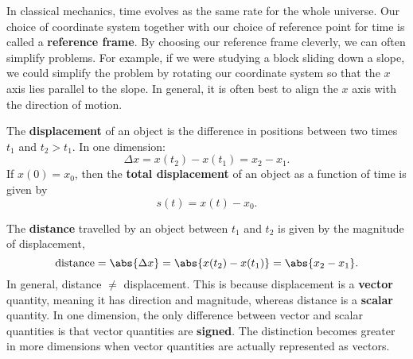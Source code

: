 \documentclass[../classical_mechanics.tex]{subfiles}
\begin{document}
        In classical mechanics, time evolves as the same rate for the whole universe.
        Our choice of coordinate system together with our choice of reference point for time is called a \textbf{reference frame}.
        By choosing our reference frame cleverly, we can often simplify problems.
        For example, if we were studying a block sliding down a slope, we could simplify the problem by rotating our coordinate system so that the $x$ axis lies parallel to the slope.
        In general, it is often best to align the $x$ axis with the direction of motion.
        \begin{definition}
            The \textbf{displacement} of an object is the difference in positions between two times $t_1$ and $t_2>t_1$. In one dimension:
            \begin{equation}
                \Delta x=x(t_2)-x(t_1)=x_2-x_1.
            \end{equation}
            If $x(0)=x_0$, then the \textbf{total displacement} of an object as a function of time is given by
            \begin{equation}
                s(t)=x(t)-x_0.
            \end{equation}
        \end{definition}
        The \textbf{distance} travelled by an object between $t_1$ and $t_2$ is given by the magnitude of displacement,
        \begin{equation}
            \mathrm{distance}=\abs{\Delta x}=\abs{x(t_2)-x(t_1)}=\abs{x_2-x_1}.
        \end{equation}
        In general, distance $\neq$ displacement.
        This is because displacement is a \textbf{vector} quantity, meaning it has direction and magnitude, whereas distance is a \textbf{scalar} quantity.
        In one dimension, the only difference between vector and scalar quantities is that vector quantities are \textbf{signed}.
        The distinction becomes greater in more dimensions when vector quantities are actually represented as vectors.
        
\end{document}
